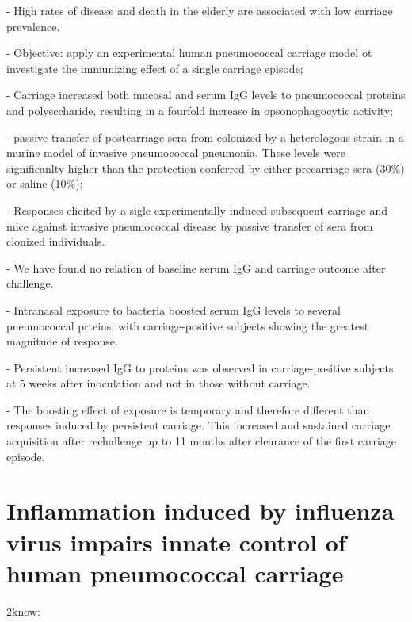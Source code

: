\documentclass[
]{book}
\begin{document}
- High rates of disease and death in the elderly are associated with low carriage prevalence.

- Objective: apply an experimental human pneumococcal carriage model ot investigate the immunizing effect of a single carriage episode;

- Carriage increased both mucosal and serum IgG levels to pneumococcal proteins and polysccharide, resulting in a fourfold increase in opsonophagocytic activity;

- passive transfer of postcarriage sera from colonized by a heterologous strain in a murine model of invasive pneumococcal pneumonia. These levels were significanlty higher than the protection conferred by either precarriage sera (30\%) or saline (10\%);

- Responses elicited by a sigle experimentally induced subsequent carriage and mice against invasive pneumococcal disease by passive transfer of sera from clonized individuals.

- We have found no relation of baseline serum IgG and carriage outcome after challenge.

- Intranasal exposure to bacteria boosted serum IgG levels to several pneumococcal prteins, with carriage-positive subjects showing the greatest magnitude of response.

- Persistent increased IgG to proteins was observed in carriage-positive subjects at 5 weeks after inoculation and not in those without carriage.

- The boosting effect of exposure is temporary and therefore different than responses induced by persistent carriage. This increased and sustained carriage acquisition after rechallenge up to 11 months after clearance of the first carriage episode.

\hypertarget{inflammation-induced-by-influenza-virus-impairs-innate-control-of-human-pneumococcal-carriage}{%
\section{Inflammation induced by influenza virus impairs innate control of human pneumococcal carriage}\label{inflammation-induced-by-influenza-virus-impairs-innate-control-of-human-pneumococcal-carriage}}

2know:
\end{document}

